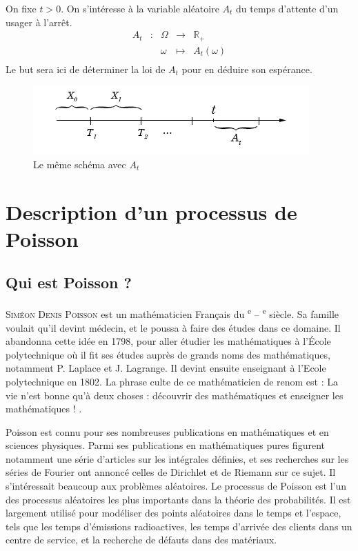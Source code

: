 \documentclass[a4paper, titlepage]{livret} %
\def\siecle#1{\textsc{\romannumeral #1}\textsuperscript{e}} %
\begin{document}
			On fixe $t > 0$. On s'intéresse à la variable aléatoire $A_{t}$ du temps d'attente d'un usager à l'arrêt.
			\[\begin{array}{ccccc}
				A_{t} & : & \Omega & \to & \mathbb{R}_{+} \\
					  &   & \omega & \mapsto & A_{t}(\omega)\\
			\end{array}\]
			Le but sera ici de déterminer la loi de $A_{t}$ pour en déduire son espérance.
			\begin{figure}[!ht]
				\centering
  					\includegraphics[scale=0.6]{g1.png}
  					\caption{Le même schéma avec $A_{t}$}
			\end{figure}

		\section{Description d'un processus de Poisson}
			\subsection{Qui est Poisson ?}
				\textsc{Siméon Denis Poisson} est un mathématicien Français du \siecle{18} – \siecle{19} siècle.
				Sa famille voulait qu'il devint médecin, et le poussa à faire des études dans ce domaine. 
				Il abandonna cette idée en 1798, pour aller étudier les mathématiques à l'École polytechnique où il fit ses études auprès de grands noms des mathématiques, notamment P. Laplace et J. Lagrange. 
				Il devint ensuite enseignant à l’Ecole polytechnique en 1802. 
				La phrase culte de ce mathématicien de renom est : \og La vie n’est bonne qu’à deux choses : découvrir des mathématiques et enseigner les mathématiques ! \fg. 

				Poisson est connu pour ses nombreuses publications en mathématiques et en sciences physiques. 
				Parmi ses publications en mathématiques pures figurent notamment une série d'articles sur les intégrales définies, et ses recherches sur les séries de Fourier ont annoncé celles de Dirichlet et de Riemann sur ce sujet.
				Il s'intéressait beaucoup aux problèmes aléatoires. 
				Le processus de Poisson est l'un des processus aléatoires les plus importants dans la théorie des probabilités. 
				Il est largement utilisé pour modéliser des points aléatoires dans le temps et l'espace, tels que les temps d'émissions radioactives, les temps d'arrivée des clients dans un centre de service, et la recherche de défauts dans des matériaux.
\end{document}
